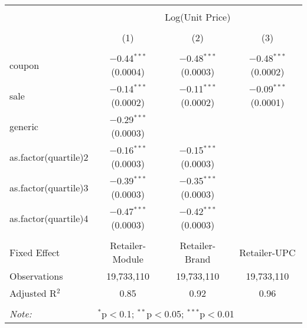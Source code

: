 
\begin{table}[!htbp] \centering 
  \caption{} 
  \label{tab:overallSavingsNonStorable} 
\begin{tabular}{@{\extracolsep{5pt}}lccc} 
\\[-1.8ex]\hline 
\hline \\[-1.8ex] 
 & \multicolumn{3}{c}{Log(Unit Price)} \\ 
\\[-1.8ex] & (1) & (2) & (3)\\ 
\hline \\[-1.8ex] 
 coupon & $-$0.44$^{***}$ (0.0004) & $-$0.48$^{***}$ (0.0003) & $-$0.48$^{***}$ (0.0002) \\ 
  sale & $-$0.14$^{***}$ (0.0002) & $-$0.11$^{***}$ (0.0002) & $-$0.09$^{***}$ (0.0001) \\ 
  generic & $-$0.29$^{***}$ (0.0003) &  &  \\ 
  as.factor(quartile)2 & $-$0.16$^{***}$ (0.0003) & $-$0.15$^{***}$ (0.0003) &  \\ 
  as.factor(quartile)3 & $-$0.39$^{***}$ (0.0003) & $-$0.35$^{***}$ (0.0003) &  \\ 
  as.factor(quartile)4 & $-$0.47$^{***}$ (0.0003) & $-$0.42$^{***}$ (0.0003) &  \\ 
 \hline \\[-1.8ex] 
Fixed Effect & Retailer-Module & Retailer-Brand & Retailer-UPC \\ 
Observations & 19,733,110 & 19,733,110 & 19,733,110 \\ 
Adjusted R$^{2}$ & 0.85 & 0.92 & 0.96 \\ 
\hline 
\hline \\[-1.8ex] 
\textit{Note:}  & \multicolumn{3}{l}{$^{*}$p$<$0.1; $^{**}$p$<$0.05; $^{***}$p$<$0.01} \\ 
\end{tabular} 
\end{table} 
